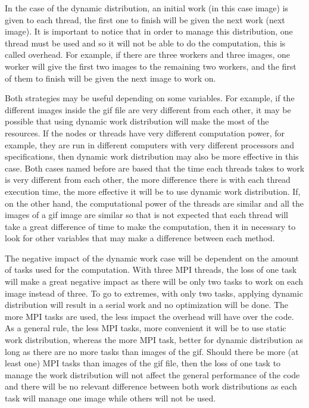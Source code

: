\documentclass[conference,compsoc]{IEEEtran}
\begin{document}
In the case of the dynamic distribution, an initial work (in this case image) is given to each thread, the first one to finish will be given the next work (next image). It is important to notice that in order to manage this distribution, one thread must be used and so it will not be able to do the computation, this is called overhead. For example, if there are three workers and three images, one worker will give the first two images to the remaining two workers, and the first of them to finish will be given the next image to work on.

Both strategies may be useful depending on some variables. For example, if the different images inside the gif file are very different from each other, it may be possible that using dynamic work distribution will make the most of the resources.
If the nodes or threads have very different computation power, for example, they are run in different computers with very different processors and specifications, then dynamic work distribution may also be more effective in this case.
Both cases named before are based that the time each threads takes to work is very different from each other, the more difference there is with each thread execution time, the more effective it will be to use dynamic work distribution. If, on the other hand, the computational power of the threads are similar and all the images of a gif image are similar so that is not expected that each thread will take a great difference of time to make the computation, then it in necessary to look for other variables that may make a difference between each method.

The negative impact of the dynamic work case will be dependent on the amount of tasks used for the computation. With three MPI threads, the loss of one task will make a great negative impact as there will be only two tasks to work on each image instead of three. To go to extremes, with only two tasks, applying dynamic distribution will result in a serial work and no optimization will be done. The more MPI tasks are used, the less impact the overhead will have over the code. As a general rule, the less MPI tasks, more convenient it will be to use static work distribution, whereas the more MPI task, better for dynamic distribution as long as there are no more tasks than images of the gif. Should there be more (at least one) MPI tasks than images of the gif file, then the loss of one task to manage the work distribution will not affect the general performance of the code and there will be no relevant difference between both work distributions as each task will manage one image while others will not be used.
\end{document}
